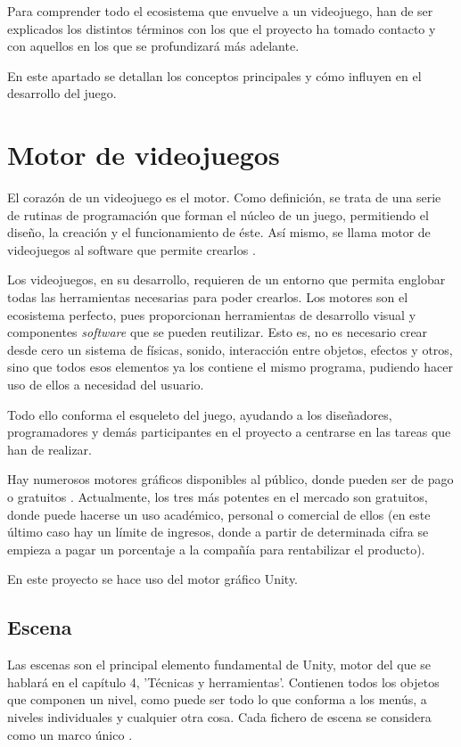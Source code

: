  \label{cap:conceptos}
Para comprender todo el ecosistema que envuelve a un videojuego, han de ser explicados los distintos términos con los que el proyecto ha tomado contacto y con aquellos en los que se profundizará más adelante.

En este apartado se detallan los conceptos principales y cómo influyen en el desarrollo del juego.

\section{Motor de videojuegos}

El corazón de un videojuego es el motor. Como definición, se trata de una serie de rutinas de programación que forman el núcleo de un juego, permitiendo el diseño, la creación y el funcionamiento de éste. Así mismo, se llama motor de videojuegos al software que permite crearlos \cite{hardz:motgraf}.

Los videojuegos, en su desarrollo, requieren de un entorno que permita englobar todas las herramientas necesarias para poder crearlos. Los motores son el ecosistema perfecto, pues proporcionan herramientas de desarrollo visual y componentes \textit{software} que se pueden reutilizar. Esto es, no es necesario crear desde cero un sistema de físicas, sonido, interacción entre objetos, efectos y otros, sino que todos esos elementos ya los contiene el mismo programa, pudiendo hacer uso de ellos a necesidad del usuario. 

Todo ello conforma el esqueleto del juego, ayudando a los diseñadores, programadores y demás participantes en el proyecto a centrarse en las tareas que han de realizar.

Hay numerosos motores gráficos disponibles al público, donde pueden ser de pago o gratuitos \cite{vand:mejmotgraf}. Actualmente, los tres más potentes en el mercado son gratuitos, donde puede hacerse un uso académico, personal o comercial de ellos (en este último caso hay un límite de ingresos, donde a partir de determinada cifra se empieza a pagar un porcentaje a la compañía para rentabilizar el producto).

En este proyecto se hace uso del motor gráfico Unity.

\subsection{Escena}

Las escenas son el principal elemento fundamental de Unity, motor del que se hablará en el capítulo 4, 'Técnicas y herramientas'. Contienen todos los objetos que componen un nivel, como puede ser todo lo que conforma a los menús, a niveles individuales y cualquier otra cosa. Cada fichero de escena se considera como un marco único \cite{doc:scene}.

